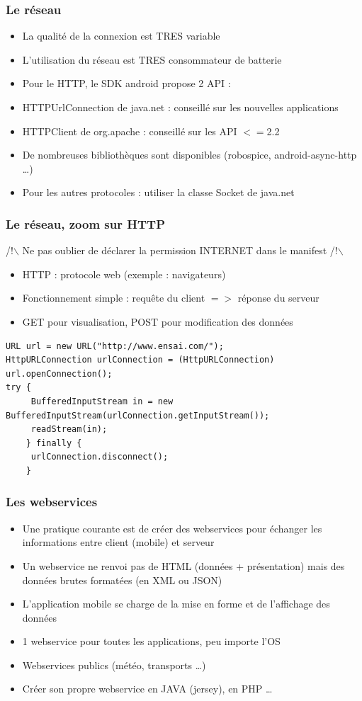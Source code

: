 \documentclass{beamer}
\begin{document}
\begin{frame}[fragile]
\frametitle{Le réseau}
\begin{itemize}
  \item La qualité de la connexion est TRES variable
  \item L'utilisation du réseau est TRES consommateur de batterie 
  \item Pour le HTTP, le SDK android propose 2 API :
  \item HTTPUrlConnection de java.net : conseillé sur les nouvelles applications
  \item HTTPClient de org.apache : conseillé sur les API $<=$2.2
  \item De nombreuses bibliothèques sont disponibles (robospice, android-async-http \ldots)
  \item Pour les autres protocoles : utiliser la classe Socket de java.net
\end{itemize}
\end{frame}
\begin{frame}[fragile]
\frametitle{Le réseau, zoom sur HTTP}
/!$\backslash$ Ne pas oublier de déclarer la permission INTERNET dans le manifest /!$\backslash$
\begin{itemize}
  \item HTTP : protocole web (exemple : navigateurs)
  \item Fonctionnement simple : requête du client $=>$ réponse du serveur
  \item GET pour visualisation, POST pour modification des données
\end{itemize}
\begin{lstlisting}
URL url = new URL("http://www.ensai.com/");
HttpURLConnection urlConnection = (HttpURLConnection) url.openConnection();
try {
     BufferedInputStream in = new BufferedInputStream(urlConnection.getInputStream());
     readStream(in); 
    } finally {
     urlConnection.disconnect();
    }
\end{lstlisting}
\end{frame}
\begin{frame}[fragile]
\frametitle{Les webservices}
\begin{itemize}
  \item Une pratique courante est de créer des webservices pour échanger les informations entre client (mobile) et serveur
  \item Un webservice ne renvoi pas de HTML (données + présentation) mais des données brutes formatées (en XML ou JSON)
  \item L'application mobile se charge de la mise en forme et de l'affichage des données
  \item 1 webservice pour toutes les applications, peu importe l'OS
  \item Webservices publics (météo, transports \ldots)
  \item Créer son propre webservice en JAVA (jersey), en PHP \ldots
\end{itemize}    
\end{frame}
\end{document}
